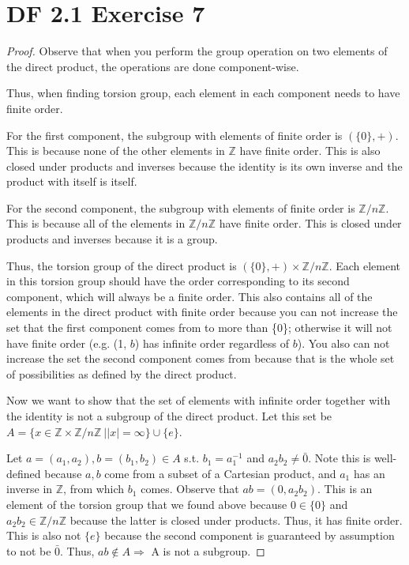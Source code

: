 \documentclass{article}
\begin{document}
\section{DF 2.1 Exercise 7}
\begin{proof}
Observe that when you perform the group operation on two elements of the direct product, the operations are done component-wise.

Thus, when finding torsion group, each element in each component needs to have finite order.

For the first component, the subgroup with elements of finite order is $(\{0\}, +)$. This is because none of the other elements in $\mathbb{Z}$ have finite order. This is also closed under products and inverses because the identity is its own inverse and the product with itself is itself.

For the second component, the subgroup with elements of finite order is $\mathbb{Z}/n\mathbb{Z}$. This is because all of the elements in $\mathbb{Z}/n\mathbb{Z}$ have finite order. This is closed under products and inverses because it is a group.

Thus, the torsion group of the direct product is $(\{0\},+) \times \mathbb{Z}/n\mathbb{Z}$. Each element in this torsion group should have the order corresponding to its second component, which will always be a finite order. This also contains all of the elements in the direct product with finite order because you can not increase the set that the first component comes from to more than \{0\}; otherwise it will not have finite order (e.g. (1, $b$) has infinite order regardless of $b$). You also can not increase the set the second component comes from because that is the whole set of possibilities as defined by the direct product.

Now we want to show that the set of elements with infinite order together with the identity is not a subgroup of the direct product. Let this set be $A=\{x \in \mathbb{Z} \times \mathbb{Z}/n\mathbb{Z}\ | |x| = \infty \} \cup \{e\}$.

Let $a=(a_1, a_2), b=(b_1, b_2) \in A$ s.t. $b_1 = a_1^{-1}$ and $a_2b_2 \neq \bar{0}$. Note this is well-defined because $a,b$ come from a subset of a Cartesian product, and $a_1$ has an inverse in $\mathbb{Z}$, from which $b_1$ comes. Observe that $ab=(0, a_2b_2)$. This is an element of the torsion group that we found above because $0 \in \{0\}$ and $a_2b_2 \in \mathbb{Z}/n\mathbb{Z}$ because the latter is closed under products. Thus, it has finite order. This is also not $\{e\}$ because the second component is guaranteed by assumption to not be $\bar{0}$. Thus, $ab \not\in A \Rightarrow$ A is not a subgroup.
\end{proof}
\end{document}
